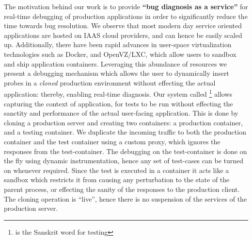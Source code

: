 
The motivation behind our work is to provide \textbf{``bug diagnosis as a service''} for real-time debugging of production applications in order to significantly reduce the time towards bug resolution.
We observe that most modern day service oriented applications are hosted on IAAS cloud providers, and can hence be easily scaled  up. 
Additionally, there have been rapid advances in user-space virtualization technologies such as Docker\cite{docker}, and OpenVZ/LXC\cite{openvz,lxc}, which allow users to sandbox and ship application containers. 
Leveraging this abundance of resources we present a debugging mechanism which allows the user to dynamically insert probes in a \emph{cloned} production environment without effecting the actual application: thereby, enabling real-time diagnosis.
 Our system called \parikshan\footnote{\parikshan is the Sanskrit word for testing} allows capturing the context of application, 
for tests to be run without effecting the sanctity and performance of the actual user-facing application. 
This is done by cloning a production server and creating two containers: a production container, and a testing container. 
We duplicate the incoming traffic to both the production container and the test container using a custom proxy, which ignores the responses from the test-container. 
The debugging on the test-container is done on the fly using dynamic instrumentation, hence any set of test-cases can be turned on whenever required. 
Since the test is executed in a container it acts like a sandbox which restricts it from causing any perturbation to the state of the parent process, or effecting the sanity of the responses to the production client. 
The cloning operation is ``live'', hence there is no suspension of the services of the production server.

